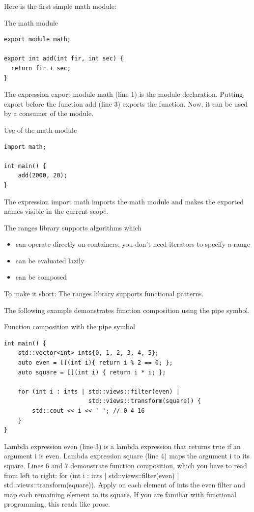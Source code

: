 Here is the first simple math module:

\noindent
The math module
\begin{lstlisting}[style=styleCXX]
export module math;

export int add(int fir, int sec) {
  return fir + sec;
}
\end{lstlisting}

The expression export module math (line 1) is the module declaration. Putting export before the function add (line 3) exports the function. Now, it can be used by a consumer of the module.

\noindent
Use of the math module
\begin{lstlisting}[style=styleCXX]
import math;

int main() {
	add(2000, 20);
}
\end{lstlisting}

The expression import math imports the math module and makes the exported names visible in the current scope.


The ranges library supports algorithms which

\begin{itemize}
\item 
can operate directly on containers; you don’t need iterators to specify a range

\item 
can be evaluated lazily

\item 
can be composed
\end{itemize}

To make it short: The ranges library supports functional patterns.

The following example demonstrates function composition using the pipe symbol.

\noindent
Function composition with the pipe symbol
\begin{lstlisting}[style=styleCXX]
int main() {
	std::vector<int> ints{0, 1, 2, 3, 4, 5};
	auto even = [](int i){ return i % 2 == 0; };
	auto square = [](int i) { return i * i; };
	
	for (int i : ints | std::views::filter(even) |
						std::views::transform(square)) {
		std::cout << i << ' '; // 0 4 16
	}
}
\end{lstlisting}

Lambda expression even (line 3) is a lambda expression that returns true if an argument i is even. Lambda expression square (line 4) maps the argument i to its square. Lines 6 and 7 demonstrate function composition, which you have to read from left to right: for (int i : ints | std::views::filter(even) | std::views::transform(square)). Apply on each element of ints the even filter and map each remaining element to its square. If you are familiar with functional programming, this reads like prose.

